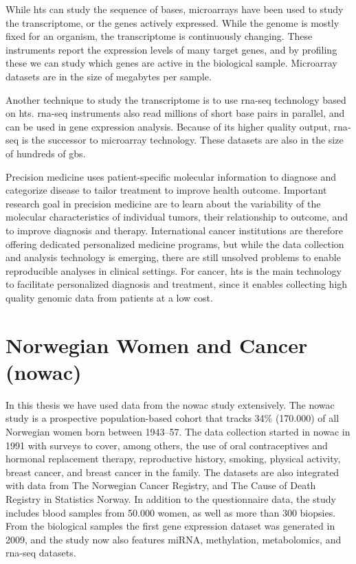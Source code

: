 While \gls{hts} can study the sequence of bases, microarrays have been used to
study the transcriptome, or the genes actively expressed. While the genome is
mostly fixed for an organism, the transcriptome is continuously changing. These
instruments report the expression levels of many target genes, and
by profiling these we can study which genes are active in the biological sample.
Microarray datasets are in the size of megabytes per sample. 

Another technique to study the transcriptome is to use \gls{rna}-seq technology
based on \gls{hts}. \gls{rna}-seq instruments also read millions of short base
pairs in parallel, and can be used in gene expression analysis. Because of its
higher quality output, \gls{rna}-seq is the successor to microarray technology.
These datasets are also in the size of hundreds of \glspl{gb}.

Precision medicine uses patient-specific molecular information to diagnose and
categorize disease to tailor treatment to improve health
outcome.\cite{national2011toward} Important research goal in precision medicine
are to learn about the variability of the molecular characteristics of
individual tumors, their relationship to outcome, and to improve diagnosis and
therapy.\cite{tannock2016limits} International cancer institutions are therefore
offering dedicated personalized medicine programs, but while the data collection
and analysis technology is emerging, there are still unsolved problems to enable
reproducible analyses in clinical settings. For cancer, \gls{hts}
is the main technology to facilitate personalized diagnosis and
treatment, since it enables collecting high quality genomic data from patients
at a low cost. 

\section{Norwegian Women and Cancer (\gls{nowac})}
In this thesis we have used data from the \gls{nowac} study extensively. 
The \gls{nowac} study is a prospective population-based cohort that tracks 34\%
(170.000) of all Norwegian women born between 1943–57.\cite{nowac} The data
collection started in \gls{nowac} in 1991 with surveys to cover, among others,
the use of oral contraceptives and hormonal replacement therapy, reproductive
history, smoking, physical activity, breast cancer, and breast cancer in the
family. The datasets are also integrated with data from The Norwegian Cancer
Registry, and The Cause of Death Registry in Statistics Norway. In addition
to the questionnaire data, the study includes blood samples from 50.000 women,
as well as more than 300 biopsies. From the biological samples the first gene
expression dataset was generated in 2009, and the study now also features miRNA,
methylation, metabolomics, and \gls{rna}-seq datasets. 

